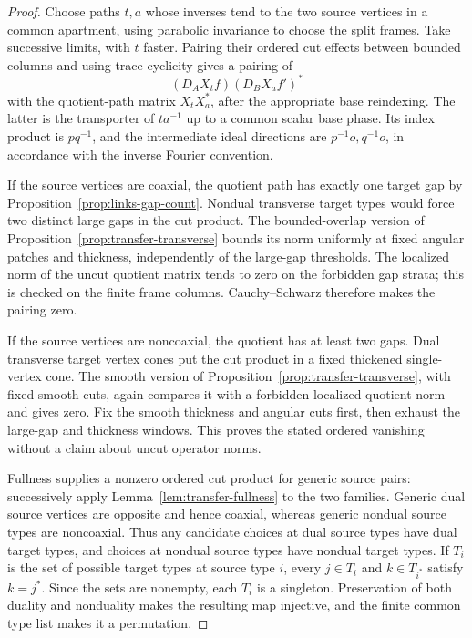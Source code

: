 \begin{proof}
Choose paths $t,a$ whose inverses tend to the two source vertices in a
common apartment, using parabolic invariance to choose the split
frames. Take successive limits, with $t$ faster. Pairing their ordered
cut effects between bounded columns and using trace cyclicity gives
a pairing of
\[
 (D_AX_t f)(D_BX_a f')^*
\]
with the quotient-path matrix $X_tX_a^*$, after the appropriate base
reindexing. The latter is the transporter of $ta^{-1}$ up to a common
scalar base phase. Its index product is $pq^{-1}$, and the intermediate
ideal directions are $p^{-1}o,q^{-1}o$, in accordance with the inverse
Fourier convention.

If the source vertices are coaxial, the quotient path has exactly
one target gap by Proposition~\ref{prop:links-gap-count}. Nondual
transverse target types would force two distinct large gaps in the
cut product. The bounded-overlap version of
Proposition~\ref{prop:transfer-transverse} bounds its norm uniformly
at fixed angular patches and thickness, independently of the large-gap
thresholds. The localized norm of the uncut quotient matrix tends
to zero on the forbidden gap strata; this is checked on the finite
frame columns. Cauchy--Schwarz therefore makes the pairing zero.

If the source vertices are noncoaxial, the quotient has at least two
gaps. Dual transverse target vertex cones put the cut product in a
fixed thickened single-vertex cone. The smooth version of
Proposition~\ref{prop:transfer-transverse}, with fixed smooth cuts,
again compares it with a forbidden localized quotient norm and gives
zero. Fix the smooth thickness and angular cuts first, then exhaust
the large-gap and thickness windows. This proves the stated ordered
vanishing without a claim about uncut operator norms.

Fullness supplies a nonzero ordered cut product for generic source
pairs: successively apply Lemma~\ref{lem:transfer-fullness} to the two
families. Generic dual source vertices are opposite and hence
coaxial, whereas generic nondual source types are noncoaxial. Thus
any candidate choices at dual source types have dual target types,
and choices at nondual source types have nondual target types.
If $T_i$ is the set of possible target types at source type $i$, every
$j\in T_i$ and $k\in T_{i^*}$ satisfy $k=j^*$. Since the sets are
nonempty, each $T_i$ is a singleton. Preservation of both duality and
nonduality makes the resulting map injective, and the finite common
type list makes it a permutation.


\end{proof}
